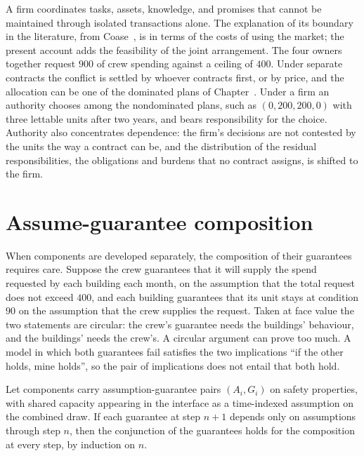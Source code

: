 A firm coordinates tasks, assets, knowledge, and promises that cannot be maintained through isolated transactions alone. The explanation of its boundary in the literature, from Coase~\cite{coase1937}, is in terms of the costs of using the market; the present account adds the feasibility of the joint arrangement. The four owners together request $900$ of crew spending against a ceiling of $400$. Under separate contracts the conflict is settled by whoever contracts first, or by price, and the allocation can be one of the dominated plans of Chapter~. Under a firm an authority chooses among the nondominated plans, such as $(0,200,200,0)$ with three lettable units after two years, and bears responsibility for the choice. Authority also concentrates dependence: the firm's decisions are not contested by the units the way a contract can be, and the distribution of the residual responsibilities, the obligations and burdens that no contract assigns, is shifted to the firm.

\section{Assume-guarantee composition}

When components are developed separately, the composition of their guarantees requires care. Suppose the crew guarantees that it will supply the spend requested by each building each month, on the assumption that the total request does not exceed $400$, and each building guarantees that its unit stays at condition $90$ on the assumption that the crew supplies the request. Taken at face value the two statements are circular: the crew's guarantee needs the buildings' behaviour, and the buildings' needs the crew's. A circular argument can prove too much. A model in which both guarantees fail satisfies the two implications ``if the other holds, mine holds'', so the pair of implications does not entail that both hold.

\begin{theorem}\label{thm:P27}
Let components carry assumption-guarantee pairs $(A_i,G_i)$ on safety properties, with shared capacity appearing in the interface as a time-indexed assumption on the combined draw. If each guarantee at step $n+1$ depends only on assumptions through step $n$, then the conjunction of the guarantees holds for the composition at every step, by induction on $n$.
\end{theorem}


